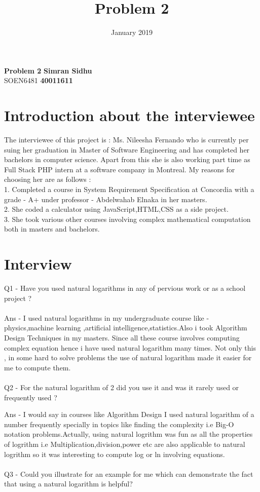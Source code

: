 \documentclass{article}
\title{Problem 2}
\date{January 2019}
\begin{document}
\noindent
\large\textbf{Problem 2} \hfill \textbf{Simran Sidhu} \\
\normalsize SOEN6481 \hfill \textbf{40011611} \\
\section{Introduction about the interviewee}
The interviewee of this project is : Ms. Nileesha Fernando who is currently per suing her graduation in Master of Software Engineering and has completed her bachelors in computer science. Apart from this she is also working part time as Full Stack PHP intern at a software company in Montreal.
My reasons for choosing her are as follows :\\
1. Completed a course in System Requirement Specification at Concordia with a grade - A+  under professor - Abdelwahab Elnaka in her masters.\\ 
2. She coded a calculator using JavaScript,HTML,CSS as a side project.\\
3. She took various other courses involving complex mathematical computation both in masters and bachelors.
\section{Interview}
Q1 - Have you used natural logarithms in any of pervious work or as a school project ? \\\\
Ans - I used natural logarithms in my undergraduate course like - physics,machine learning ,artificial intelligence,statistics.Also i took 
Algorithm Design Techniques in my masters. Since all these course involves computing complex equation hence i have used natural logarithm many times. Not only this , in some hard to solve problems the use of natural logarithm made it easier for me to compute them.\\
\\
Q2 - For the natural logarithm of 2  did you use it and was it rarely used or frequently used ?

Ans - I would say in courses like Algorithm Design I used natural logarithm of a number frequently specially in topics like finding the complexity i.e  Big-O notation problems.Actually, using natural logrithm was fun as all the properties of logrithm i.e Multiplication,division,power etc are also applicable to natural logrithm so it was interesting to compute log or ln involving equations.\\
\\
Q3 - Could you illustrate for an example for me which can demonstrate the fact that using a natural logarithm is helpful?\\
\end{document}
